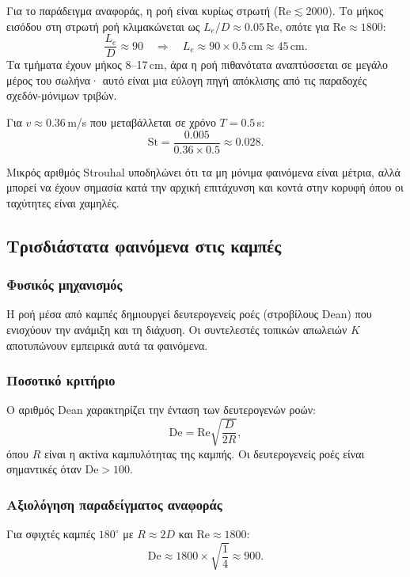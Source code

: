 \documentclass[11pt]{article}
\begin{document}
Για το παράδειγμα αναφοράς, η ροή είναι κυρίως στρωτή ($\text{Re} \lesssim 2000$). Το μήκος εισόδου στη στρωτή ροή κλιμακώνεται ως $L_e/D \approx 0.05\,\text{Re}$, οπότε για $\text{Re} \approx 1800$:
\[
  \frac{L_e}{D} \approx 90 \quad \Rightarrow \quad L_e \approx 90 \times 0.5\,\text{cm} \approx 45\,\text{cm}.
\]
Τα τμήματα έχουν μήκος 8--17\,cm, άρα η ροή πιθανότατα αναπτύσσεται σε μεγάλο μέρος του σωλήνα· αυτό είναι μια εύλογη πηγή απόκλισης από τις παραδοχές σχεδόν-μόνιμων τριβών.

Για $v \approx 0.36$\,m/s που μεταβάλλεται σε χρόνο $T = 0.5$\,s:
\[
  \text{St} = \frac{0.005}{0.36 \times 0.5} \approx 0.028.
\]

Μικρός αριθμός Strouhal υποδηλώνει ότι τα μη μόνιμα φαινόμενα είναι μέτρια, αλλά μπορεί να έχουν σημασία κατά την αρχική επιτάχυνση και κοντά στην κορυφή όπου οι ταχύτητες είναι χαμηλές.

\subsection{Τρισδιάστατα φαινόμενα στις καμπές}

\subsubsection{Φυσικός μηχανισμός}

Η ροή μέσα από καμπές δημιουργεί δευτερογενείς ροές (στροβίλους Dean) που ενισχύουν την ανάμιξη και τη διάχυση. Οι συντελεστές τοπικών απωλειών $K$ αποτυπώνουν εμπειρικά αυτά τα φαινόμενα.

\subsubsection{Ποσοτικό κριτήριο}

Ο αριθμός Dean χαρακτηρίζει την ένταση των δευτερογενών ροών:
\begin{equation}
  \text{De} = \text{Re}\sqrt{\frac{D}{2R}},
  \label{eq:dean}
\end{equation}
όπου $R$ είναι η ακτίνα καμπυλότητας της καμπής. Οι δευτερογενείς ροές είναι σημαντικές όταν $\text{De} > 100$.

\subsubsection{Αξιολόγηση παραδείγματος αναφοράς}

Για σφιχτές καμπές $180^\circ$ με $R \approx 2D$ και $\text{Re} \approx 1800$:
\[
  \text{De} \approx 1800 \times \sqrt{\frac{1}{4}} \approx 900.
\]
\end{document}
